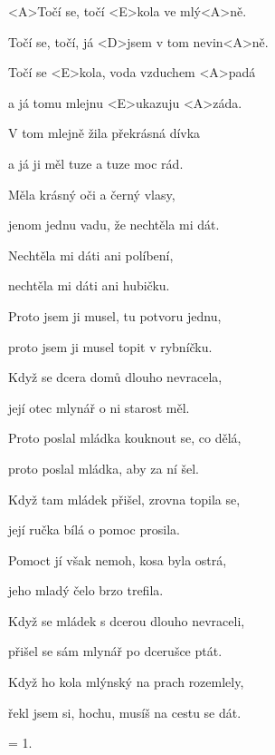 

\zs
<A>Točí se, točí <E>kola ve mlý<A>ně.

Točí se, točí, já <D>jsem v tom nevin<A>ně.

Točí se <E>kola, voda vzduchem <A>padá

a já tomu mlejnu <E>ukazuju <A>záda.
\ks

\zs
V tom mlejně žila překrásná dívka

a já ji měl tuze a tuze moc rád.

Měla krásný oči a černý vlasy,

jenom jednu vadu, že nechtěla mi dát.
\ks

\zs
Nechtěla mi dáti ani políbení,

nechtěla mi dáti ani hubičku.

Proto jsem ji musel, tu potvoru jednu,

proto jsem ji musel topit v rybníčku.
\ks

\zs
Když se dcera domů dlouho nevracela,

její otec mlynář o ni starost měl.

Proto poslal mládka kouknout se, co dělá,

proto poslal mládka, aby za ní šel.
\ks

\zs
Když tam mládek přišel, zrovna topila se,

její ručka bílá o pomoc prosila.

Pomoct jí však nemoh, kosa byla ostrá,

jeho mladý čelo brzo trefila.
\ks

\zs
Když se mládek s dcerou dlouho nevraceli,

přišel se sám mlynář po dcerušce ptát.

Když ho kola mlýnský na prach rozemlely,

řekl jsem si, hochu, musíš na cestu se dát.
\ks

\zs
= 1.
\ks

\kp
